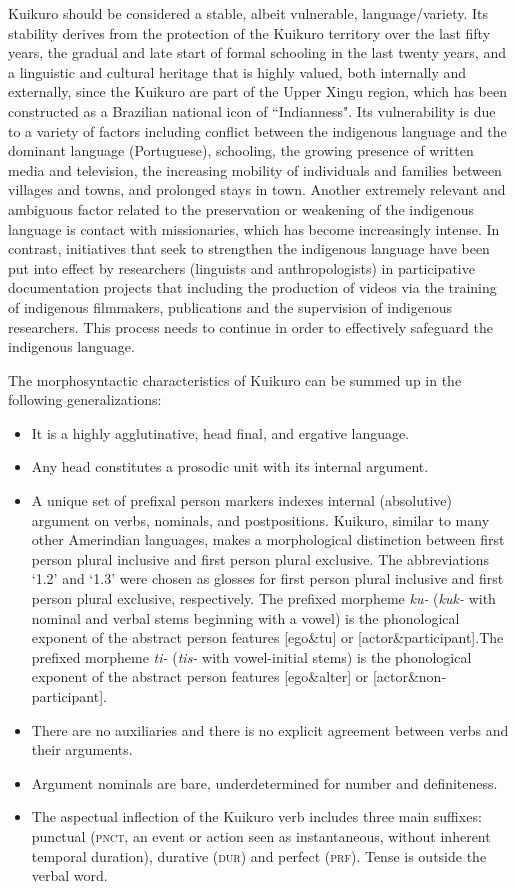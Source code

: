\documentclass[output=paper,
modfonts,nonflat
]{langsci/langscibook}
\begin{document}
Kuikuro should be considered a stable, albeit vulnerable, language/variety. Its stability derives from the protection of the Kuikuro territory over the last fifty years, the gradual and late start of formal schooling in the last twenty years, and a linguistic and cultural heritage that is highly valued, both internally and externally, since the Kuikuro are part of the Upper Xingu region, which has been constructed as a Brazilian national icon of “Indianness". Its vulnerability is due to a variety of factors including conflict between the indigenous language and the dominant language (Portuguese), schooling, the growing presence of written media and television, the increasing mobility of individuals and families between villages and towns, and prolonged stays in town.  Another extremely relevant and ambiguous factor related to the preservation or weakening of the indigenous language is contact with missionaries, which has become increasingly intense. In contrast, initiatives that seek to strengthen the indigenous language have been put into effect by researchers (linguists and anthropologists) in participative documentation projects that including the production of videos via the training of indigenous filmmakers, publications and the supervision of indigenous researchers. This process needs to continue in order to effectively safeguard the indigenous language.

The morphosyntactic characteristics of Kuikuro can be summed up in the following generalizations:

\begin{itemize}
 \item  It is a highly agglutinative, head final, and ergative language. 
 \item  Any head constitutes a prosodic unit with its internal argument. 
 \item A unique set of prefixal person markers indexes internal (absolutive) argument on verbs, nominals, and postpositions. Kuikuro, similar to many other Amerindian languages, makes a morphological  distinction between first person plural inclusive and first person plural exclusive. The abbreviations ‘1.2’ and ‘1.3’ were chosen as glosses for first person plural inclusive and first person plural exclusive, respectively. The prefixed morpheme \emph{ku-} (\emph{kuk-} with nominal and verbal stems beginning with a vowel) is the phonological exponent of the abstract person features [ego\&tu] or [actor\&participant].The prefixed morpheme \emph{ti-} (\emph{tis-} with vowel-initial stems) is the phonological exponent of  the abstract person features [ego\&alter] or [actor\&non-participant].
 \item There are no auxiliaries and there is no explicit agreement between verbs and their arguments. 
 \item Argument nominals are bare, underdetermined for number and definiteness.
 \item The aspectual inflection of the Kuikuro verb includes three main suffixes: punctual (\textsc{pnct}, an event or action seen as instantaneous, without inherent temporal duration), durative (\textsc{dur}) and perfect (\textsc{prf}). Tense is outside the verbal word.
\end{itemize}
 
\end{document}
